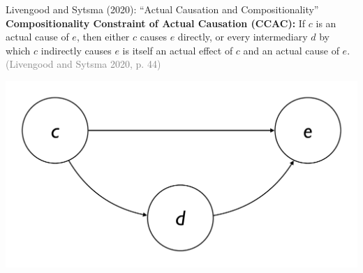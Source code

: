 \documentclass[xcolor=table,9pt,aspectratio=169]{beamer}
\begin{document}
\begin{frame}{\vspace*{10mm}Livengood and Sytsma (2020): ``Actual Causation and Compositionality''}
\vspace*{-5mm}
\textbf{Compositionality Constraint of Actual Causation (CCAC):} If $c$ is an actual cause of $e$, then either $c$ causes $e$ directly, or every intermediary $d$ by which $c$ indirectly causes $e$ is itself an actual effect of $c$ and an actual cause of $e$. \textcolor{gray}{(Livengood and Sytsma 2020, p. 44)}
\begin{center}
   \includegraphics[width=0.5\linewidth]{figures/constraint.pdf}
\end{center}
\end{frame}
\end{document}
